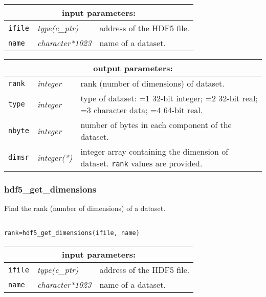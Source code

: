 \noindent
\begin{tabular}{|p{1.5cm}|p{3cm}|p{10cm}|}
\hline
\multicolumn{3}{|c|}{\bf input parameters:} \\
\hline
{\tt ifile} & {\it type(c\_ptr)} & address of the HDF5 file. \\
\hline
{\tt name} & {\it character*1023} & name of a dataset. \\
\hline
\end{tabular}

\vskip 0.8cm

\noindent
\begin{tabular}{|p{1.5cm}|p{3cm}|p{10cm}|}
\hline
\multicolumn{3}{|c|}{\bf output parameters:} \\
\hline
{\tt rank} & {\it integer} & rank (number of dimensions) of dataset. \\
\hline
{\tt type} & {\it integer} & type of dataset: =1 32-bit integer; 
                                    =2 32-bit real; =3 character data; 
				    =4 64-bit real. \\
\hline
{\tt nbyte} & {\it integer} & number of bytes in each component of the dataset. \\
\hline
{\tt dimsr} & {\it integer(*)} & integer array containing the dimension of dataset. {\tt rank} values are provided. \\
\hline
\end{tabular}

\subsubsection{hdf5\_get\_dimensions}

Find the rank (number of dimensions) of a dataset.

\begin{verbatim}

rank=hdf5_get_dimensions(ifile, name)
\end{verbatim}

\noindent
\begin{tabular}{|p{1.5cm}|p{3cm}|p{10cm}|}
\hline
\multicolumn{3}{|c|}{\bf input parameters:} \\
\hline
{\tt ifile} & {\it type(c\_ptr)} & address of the HDF5 file. \\
\hline
{\tt name} & {\it character*1023} & name of a dataset. \\
\hline
\end{tabular}

\vskip 0.8cm

